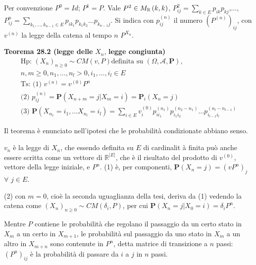 \documentclass{article}
\begin{document}
Per convenzione $P^{0}=Id$; $P^{1}=P$. Vale $P^{2}\in M_{%
\mathbb{R}
}\left( k,k\right) $, $P_{ij}^{2}=\sum_{k\in E}p_{ik}p_{kj}$,..., $%
P_{ij}^{n}=\sum_{k_{1},...,k_{n-1}\in
E}p_{ik_{1}}p_{k_{1}k_{2}}...p_{k_{n-1}j}$. Si indica con $p_{ij}^{\left(
n\right) }$ il numero $\left( P^{\left( n\right) }\right) _{ij}$, con $%
v^{\left( n\right) }$ la legge della catena al tempo $n$ $P^{X_{n}}$.

\textbf{Teorema 28.2 (legge delle }$X_{n}$, \textbf{legge congiunta)} 
\begin{gather*}
\text{Hp: }\left( X_{n}\right) _{n\geq 0}\sim CM\left( v,P\right) \text{
definita su }\left( \Omega ,\mathcal{A},\mathbf{P}\right) \text{, } \\
n,m\geq 0,n_{1},...,n_{l}>0,i_{1},...,i_{l}\in E \\
\text{Ts: (1) }v^{\left( n\right) }=v^{\left( 0\right) }P^{n} \\
\text{(2) }p_{ij}^{\left( n\right) }=\mathbf{P}\left(
X_{n+m}=j|X_{m}=i\right) =\mathbf{P}_{i}\left( X_{n}=j\right) \\
\text{(3) }\mathbf{P}\left( X_{n_{1}}=i_{1},...X_{n_{l}}=i_{l}\right)
=\sum_{i\in E}v_{i}^{\left( 0\right) }p_{ii_{1}}^{\left( n_{1}\right)
}p_{i_{1}i_{2}}^{\left( n_{2}-n_{1}\right) }...p_{i_{l-1}i_{l}}^{\left(
n_{l}-n_{l-1}\right) }
\end{gather*}

Il teorema \`{e} enunciato nell'ipotesi che le probabilit\`{a} condizionate
abbiano senso.

$v_{n}$ \`{e} la legge di $X_{n}$, che essendo definita su $E$ di cardinalit%
\`{a} finita pu\`{o} anche essere scritta come un vettore di $%
\mathbb{R}
^{\left\vert E\right\vert }$, che \`{e} il risultato del prodotto di $%
v^{\left( 0\right) }$, vettore della legge iniziale, e $P^{n}$. (1) \`{e},
per componenti, $\mathbf{P}\left( X_{n}=j\right) =\left( vP^{n}\right) _{j}$ 
$\forall $ $j\in E$.

(2) con $m=0$, cio\`{e} la seconda uguaglianza della tesi, deriva da (1)
vedendo la catena come $\left( X_{n}\right) _{n\geq 0}\sim CM\left( \delta
_{i},P\right) $, per cui $\mathbf{P}\left( X_{n}=j|X_{0}=i\right) =\delta
_{i}P^{n}$.

Mentre $P$ contiene le probabilit\`{a} che regolano il passaggio da un certo
stato in $X_{m}$ a un certo in $X_{m+1}$, le probabilit\`{a} sul passaggio
da uno stato in $X_{m}$ a un altro in $X_{m+n}$ sono contenute in $P^{n}$,
detta matrice di transizione a $n$ passi: $\left( P^{n}\right) _{ij}$ \`{e}
la probabilit\`{a} di passare da $i$ a $j$ in $n$ passi.
\end{document}
